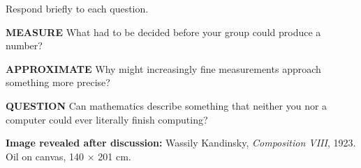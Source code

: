 \documentclass[11pt]{article}
\begin{document}
Respond briefly to each question.

\textbf{\textcolor{LangRed}{MEASURE}} \quad
What had to be decided before your group could produce a number?

\vspace{0.65in}

\textbf{\textcolor{LangRed}{APPROXIMATE}} \quad
Why might increasingly fine measurements approach something more precise?

\vspace{0.65in}

\textbf{\textcolor{LangRed}{QUESTION}} \quad
Can mathematics describe something that neither you nor a computer
could ever literally finish computing?

\vfill

{\small
\textbf{Image revealed after discussion:}
Wassily Kandinsky, \emph{Composition VIII}, 1923.
Oil on canvas, 140 $\times$ 201 cm.
}
\end{document}
